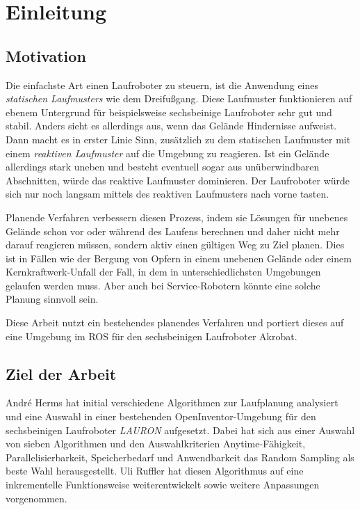 \chapter{Einleitung}
\label{kap1}

\section{Motivation}

Die einfachste Art einen Laufroboter zu steuern, ist die Anwendung eines \emph{statischen Laufmusters} wie dem Dreifußgang. Diese Laufmuster funktionieren auf ebenem Untergrund für beispielsweise sechsbeinige Laufroboter sehr gut und stabil. Anders sieht es allerdings aus, wenn das Gelände Hindernisse aufweist. Dann macht es in erster Linie Sinn, zusätzlich zu dem statischen Laufmuster mit einem \emph{reaktiven Laufmuster} auf die Umgebung zu reagieren. Ist ein Gelände allerdings stark uneben und besteht eventuell sogar aus unüberwindbaren Abschnitten, würde das reaktive Laufmuster dominieren. Der Laufroboter würde sich nur noch langsam mittels des reaktiven Laufmusters nach vorne tasten.

Planende Verfahren verbessern diesen Prozess, indem sie Lösungen für unebenes Gelände schon vor oder während des Laufens berechnen und daher nicht mehr darauf reagieren müssen, sondern aktiv einen gültigen Weg zu Ziel planen. Dies ist in Fällen wie der Bergung von Opfern in einem unebenen Gelände oder einem Kernkraftwerk-Unfall der Fall, in dem in unterschiedlichsten Umgebungen gelaufen werden muss. Aber auch bei Service-Robotern könnte eine solche Planung sinnvoll sein.

Diese Arbeit nutzt ein bestehendes planendes Verfahren und portiert dieses auf eine Umgebung im \ac{ROS} für den sechsbeinigen Laufroboter Akrobat.

\section{Ziel der Arbeit}

André Herms \autocite{herms2004} hat initial verschiedene Algorithmen zur Laufplanung analysiert und eine Auswahl in einer bestehenden OpenInventor-Umgebung \autocite{inventor} für den sechsbeinigen Laufroboter \emph{LAURON} aufgesetzt. Dabei hat sich aus einer Auswahl von sieben Algorithmen und den Auswahlkriterien Anytime-Fähigkeit, Parallelisierbarkeit, Speicherbedarf und Anwendbarkeit das Random Sampling als beste Wahl herausgestellt. Uli Ruffler \autocite{ruffler2006} hat diesen Algorithmus auf eine inkrementelle Funktionsweise weiterentwickelt sowie weitere Anpassungen vorgenommen.

